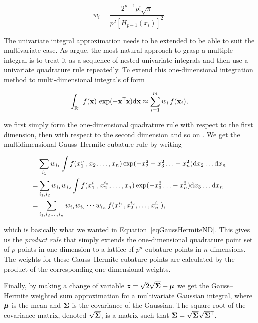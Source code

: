 \begin{equation} \label{eqGaussHermiteWeights}
    w_i = \frac{2^{p-1}p!\sqrt{\pi}}{p^2[H_{p-1}(x_i)]^2}.
\end{equation}

The univariate integral approximation needs to be extended to be able to suit the multivariate case. As \citet{Wu+Hu+Wu+Hu:2006}  argue, the most natural approach to grasp a multiple integral is to treat it as a sequence of nested univariate integrals and then use a univariate quadrature rule repeatedly. To extend this one-dimensional integration method to multi-dimensional integrals of form

\begin{equation} \label{eqGaussHermiteND}
    \int_{\mathbb{R}^n} f(\mathbf{x})\,\exp(-\mathbf{x}\mathsf{^T}\mathbf{x}) \mathrm{d} \mathbf{x} \approx \sum_{i=1}^m w_i\,f(\mathbf{x}_i),
\end{equation}

\noindent%
we first simply form the one-dimensional quadrature rule with respect to the first dimension, then with respect to the second dimension and so on \citep{Cools:1997}. We get the multidimensional Gauss--Hermite cubature rule by writing

\begin{align*}
    & \sum_{i_1} w_{i_1} \int f(x_1^{i_1},x_2, \ldots, x_n) \exp(-x_2^2 -x_3^2 \ldots -x_n^2) \mathrm{d} x_2 \ldots \mathrm{d} x_n \\
    =& \sum_{i_1,i_2} w_{i_1} w_{i_2} \int f(x_1^{i_1},x_2^{i_2}, \ldots, x_n) \exp(-x_3^2 \ldots -x_n^2) \mathrm{d} x_3 \ldots \mathrm{d} x_n \\
    =& \sum_{i_1,i_2,\ldots,i_n} w_{i_1} w_{i_2} \cdots  w_{i_n} \, f(x_1^{i_1},x_2^{i_2}, \ldots, x_n^{i_n}),
\end{align*}

\noindent%
which is basically what we wanted in Equation~\eqref{eqGaussHermiteND}. This gives us the \emph{product rule} that simply extends the one-dimensional quadrature point set of $p$ points in one dimension to a lattice of $p^n$ cubature points in $n$ dimensions. The weights for these Gauss--Hermite cubature points are calculated by the product of the corresponding one-dimensional weights.

Finally, by making a change of variable $\mathbf{x} = \sqrt{2}\sqrt{\mathbf{\Sigma}} + \boldsymbol{\mu}$ we get the Gauss--Hermite weighted sum approximation for a multivariate Gaussian integral, where $\boldsymbol{\mu}$ is the mean and $\boldsymbol{\Sigma}$ is the covariance of the Gaussian. The square root of the covariance matrix, denoted $\sqrt{\boldsymbol{\Sigma}}$, is  a matrix such that $\boldsymbol{\Sigma} = \sqrt{\boldsymbol{\Sigma}}\sqrt{\boldsymbol{\Sigma}}\mathsf{^T}$.

